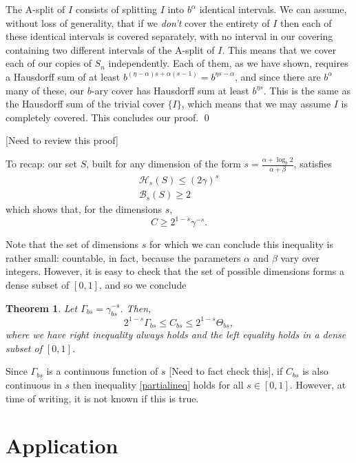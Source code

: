 \documentclass[11pt, reqno]{amsart}
\newcommand{\HH}{\mathcal{H}}
\newcommand{\BB}{\mathcal{B}}
\newtheorem{theorem}{Theorem}
\begin{document}
The A-split of $I$ consists of splitting $I$ into $b^\alpha$ identical intervals. We can assume, without loss of generality, that if we \emph{don't} cover the entirety of $I$ then each of these identical intervals is covered separately, with no interval in our covering containing two different intervals of the A-split of $I$. This means that we cover each of our copies of $S_n$ independently. Each of them, as we have shown, requires a Hausdorff sum of at least $b^{(\eta - \alpha)s + \alpha(s - 1)} = b^{\eta s - \alpha}$, and since there are $b^\alpha$ many of these, our $b$-ary cover has Hausdorff sum at least $b^{\eta s}$. This is the same as the Hausdorff sum of the trivial cover $\{I\}$, which means that we may assume $I$ is completely covered. This concludes our proof. \qed

[Need to review this proof]

To recap: our set $S$, built for any dimension of the form $s = \frac{\alpha + \log_b 2}{\alpha + \beta}$, satisfies
\begin{gather*}
\HH_s(S) \leq (2\gamma)^s\\
\BB_s(S) \geq 2
\end{gather*}
which shows that, for the dimensions $s$,
\[C \geq 2^{1-s} \gamma^{-s}.\]

Note that the set of dimensions $s$ for which we can conclude this inequality is rather small: countable, in fact, because the parameters $\alpha$ and $\beta$ vary over integers. However, it is easy to check that the set of possible dimensions forms a dense subset of $[0,1]$, and so we conclude

\begin{theorem}\label{boundtheorem}
Let $\Gamma_{bs} = \gamma_{bs}^{-s}$. Then,
\begin{equation} \label{partialineq}
2^{1-s} \Gamma_{bs} \leq C_{bs} \leq 2^{1-s} \Theta_{bs},
\end{equation}
where we have right inequality always holds and the left equality holds in a dense subset of $\left[0, 1 \right]$.
\end{theorem}

Since $\Gamma_{bs}$ is a continuous function of $s$ [Need to fact check this], if $C_{bs}$ is also continuous in $s$ then inequality \eqref{partialineq} holds for all $s \in [0,1]$. However, at time of writing, it is not known if this is true.

\section{Application}\label{secfinal}
\end{document}
